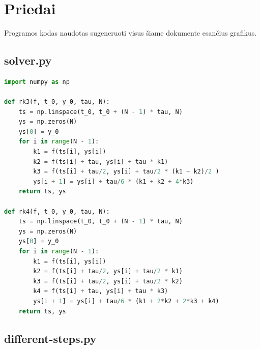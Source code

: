 \documentclass[11pt]{article}
\begin{document}
\newpage
\section{Priedai}

Programos kodas naudotas sugeneruoti visus šiame dokumente esančius grafikus.

\subsection{solver.py}

\begin{lstlisting}[language=Python]
import numpy as np

def rk3(f, t_0, y_0, tau, N):
    ts = np.linspace(t_0, t_0 + (N - 1) * tau, N)
    ys = np.zeros(N)
    ys[0] = y_0
    for i in range(N - 1):
        k1 = f(ts[i], ys[i])
        k2 = f(ts[i] + tau, ys[i] + tau * k1)
        k3 = f(ts[i] + tau/2, ys[i] + tau/2 * (k1 + k2)/2 )
        ys[i + 1] = ys[i] + tau/6 * (k1 + k2 + 4*k3)
    return ts, ys

def rk4(f, t_0, y_0, tau, N):
    ts = np.linspace(t_0, t_0 + (N - 1) * tau, N)
    ys = np.zeros(N)
    ys[0] = y_0
    for i in range(N - 1):
        k1 = f(ts[i], ys[i])
        k2 = f(ts[i] + tau/2, ys[i] + tau/2 * k1)
        k3 = f(ts[i] + tau/2, ys[i] + tau/2 * k2)
        k4 = f(ts[i] + tau, ys[i] + tau * k3)
        ys[i + 1] = ys[i] + tau/6 * (k1 + 2*k2 + 2*k3 + k4)
    return ts, ys
\end{lstlisting}

\newpage
\subsection{different-steps.py}
\end{document}
